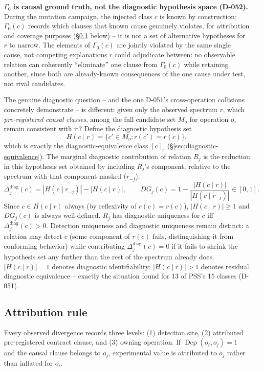 \documentclass[11pt,a4paper]{article}
\begin{document}
\textbf{$\Gamma_0$ is causal ground truth, not the diagnostic hypothesis space (D-052).} During the mutation campaign, the injected class $c$ is known by construction; $\Gamma_0(c)$ records which clauses that known cause genuinely violates, for attribution and coverage purposes (\S\ref{sec:attribution-rule} below) -- it is not a set of alternative hypotheses for $r$ to narrow. The elements of $\Gamma_0(c)$ are jointly violated by the same single cause, not competing explanations $r$ could adjudicate between: no observable relation can coherently ``eliminate'' one clause from $\Gamma_0(c)$ while retaining another, since both are already-known consequences of the one cause under test, not rival candidates.

The genuine diagnostic question -- and the one D-051's cross-operation collisions concretely demonstrate -- is different: given only the observed spectrum $r$, which \emph{pre-registered causal classes}, among the full candidate set $M_o$ for operation $o$, remain consistent with it? Define the diagnostic hypothesis set
\[H(c\mid r) = \{c' \in M_o : r(c') = r(c)\},\]
which is exactly the diagnostic-equivalence class $[c]_r$ (\S\ref{sec:diagnostic-equivalence}). The marginal diagnostic contribution of relation $R_j$ is the reduction in this hypothesis set obtained by including $R_j$'s component, relative to the spectrum with that component masked ($r_{-j}$):
\[\Delta_j^{\text{diag}}(c) = |H(c\mid r_{-j})| - |H(c\mid r)|, \qquad DG_j(c) = 1 - \frac{|H(c\mid r)|}{|H(c\mid r_{-j})|} \in [0,1].\]
Since $c \in H(c\mid r)$ always (by reflexivity of $r(c)=r(c)$), $|H(c\mid r)|\ge 1$ and $DG_j(c)$ is always well-defined. $R_j$ has diagnostic uniqueness for $c$ iff $\Delta_j^{\text{diag}}(c)>0$. Detection uniqueness and diagnostic uniqueness remain distinct: a relation may detect $c$ (some component of $r(c)$ fails, distinguishing it from conforming behavior) while contributing $\Delta_j^{\text{diag}}(c)=0$ if it fails to shrink the hypothesis set any further than the rest of the spectrum already does. $|H(c\mid r)|=1$ denotes diagnostic identifiability; $|H(c\mid r)|>1$ denotes residual diagnostic equivalence -- exactly the situation found for 13 of PSS's 15 classes (D-051).

\subsection{Attribution rule}\label{sec:attribution-rule}
Every observed divergence records three levels: (1) detection site, (2) attributed pre-registered contract clause, and (3) owning operation. If $\operatorname{Dep}(o_i,o_j)=1$ and the causal clause belongs to $o_j$, experimental value is attributed to $o_j$ rather than inflated for $o_i$.
\end{document}
